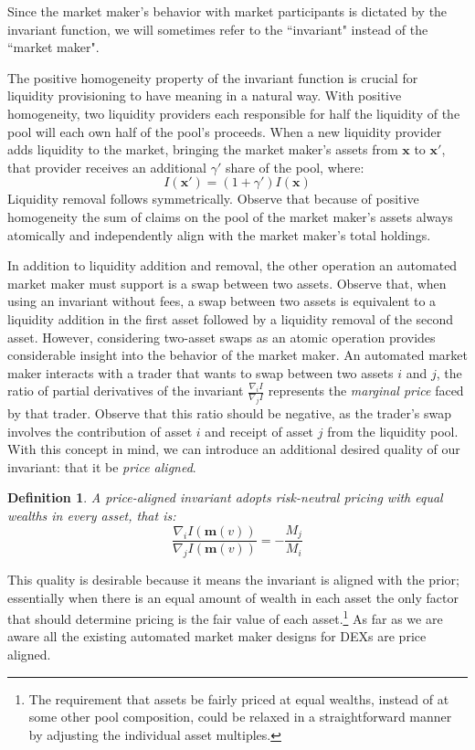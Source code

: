 \documentclass[11pt]{article}
\newcommand{\grad}{\nabla} %
\renewcommand{\vec}[1]{\mathbf{ #1 }}
\newtheorem{defn}{Definition}
\begin{document}
Since the market maker's behavior with market participants is dictated by the invariant function, we will sometimes refer to the ``invariant" instead of the ``market maker".

The positive homogeneity property of the invariant function is crucial for liquidity provisioning to have meaning in a natural way. With positive homogeneity, two liquidity providers each responsible for half the liquidity of the pool will each own half of the pool's proceeds. When a new liquidity provider adds liquidity to the market, bringing the market maker's assets from $\vec{x}$ to $\vec{x'}$, that provider receives an additional $\gamma'$ share of the pool, where:
\[ I(\vec{x'}) = (1+\gamma') I(\vec{x}) \]
Liquidity removal follows symmetrically. Observe that because of positive homogeneity the sum of claims on the pool of the market maker's assets always atomically and independently align with the market maker's total holdings.

In addition to liquidity addition and removal, the other operation an automated market maker must support is a swap between two assets. Observe that, when using an invariant without fees, a swap between two assets is equivalent to a liquidity addition in the first asset followed by a liquidity removal of the second asset. However, considering two-asset swaps as an atomic operation provides considerable insight into the behavior of the market maker.
%
An automated market maker interacts with a trader that wants to swap between two assets $i$ and $j$, the ratio of partial derivatives of the invariant $\frac{\grad_i I}{\grad_j I}$ represents the \emph{marginal price} faced by that trader. Observe that this ratio should be negative, as the trader's swap involves the contribution of asset $i$ and receipt of asset $j$ from the liquidity pool. With this concept in mind, we can introduce an additional desired quality of our invariant: that it be \emph{price aligned}. 

\begin{defn}
A \emph{price-aligned} invariant adopts risk-neutral pricing with equal wealths in every asset, that is:
\[\frac{\grad_i I(\vec{m}(v))}{\grad_j I(\vec{m}(v))} = -\frac{M_j}{M_i} \]
\end{defn}

This quality is desirable because it means the invariant is aligned with the prior; essentially when there is an equal amount of wealth in each asset the only factor that should determine pricing is the fair value of each asset.\footnote{The requirement that assets be fairly priced at equal wealths, instead of at some other pool composition, could be relaxed in a straightforward manner by adjusting the individual asset multiples.} As far as we are aware all the existing automated market maker designs for DEXs are price aligned.
\end{document}
